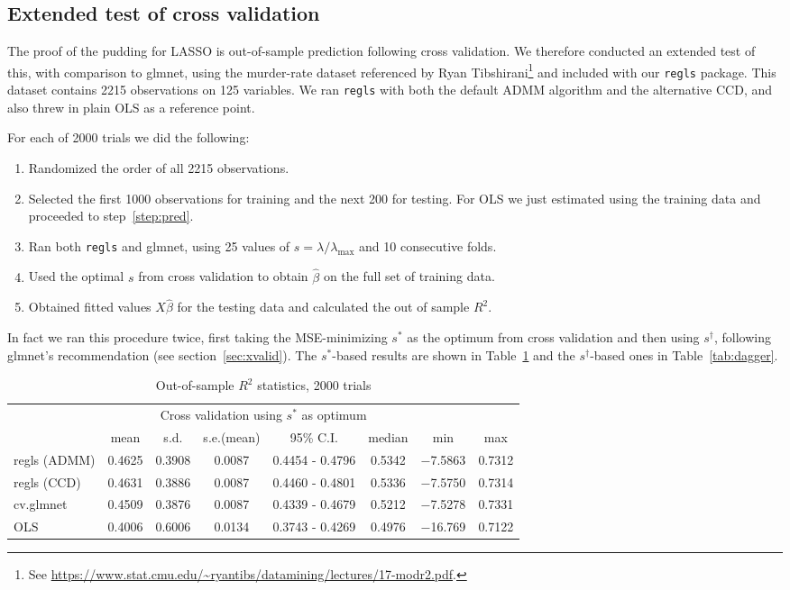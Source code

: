\documentclass{article}
\begin{document}
\subsection*{Extended test of cross validation}

The proof of the pudding for LASSO is out-of-sample prediction
following cross validation. We therefore conducted an extended test of
this, with comparison to \textsf{glmnet}, using the murder-rate
dataset referenced by Ryan Tibshirani\footnote{See
  \url{https://www.stat.cmu.edu/~ryantibs/datamining/lectures/17-modr2.pdf}.}
and included with our \texttt{regls} package. This dataset contains
2215 observations on 125 variables. We ran \texttt{regls} with both
the default ADMM algorithm and the alternative CCD, and also threw in
plain OLS as a reference point.

For each of 2000 trials we did the following:
\begin{enumerate}
\item Randomized the order of all 2215 observations.
\item Selected the first 1000 observations for training and the next
  200 for testing. For OLS we just estimated using the
  training data and proceeded to step~\ref{step:pred}.
\item Ran both \texttt{regls} and \textsf{glmnet}, using 25 values
  of $s = \lambda/\lambda_{\max}$ and 10 consecutive folds.
\item Used the optimal $s$ from cross validation to obtain
  $\hat{\beta}$ on the full set of training data.
\item Obtained fitted values $X\hat{\beta}$ for the testing data and
  calculated the out of sample $R^2$.
  \label{step:pred}
\end{enumerate}

In fact we ran this procedure twice, first taking the MSE-minimizing
$s^*$ as the optimum from cross validation and then using
$s^{\dagger}$, following \textsf{glmnet}'s recommendation (see
section~\ref{sec:xvalid}). The $s^*$-based results are shown in
Table~\ref{tab:star} and the $s^{\dagger}$-based ones in
Table~\ref{tab:dagger}.

\begin{table}[htbp]
  \centering
  \begin{tabular}{lccccccc}
    \multicolumn{8}{c}{Cross validation using $s^*$ as optimum} \\
 & mean & s.d. & s.e.(mean) & 95\% C.I. & median & min & max \\
\textsf{regls (ADMM)} & 0.4625 & 0.3908 & 0.0087 & 0.4454 - 0.4796 & 0.5342 & $-$7.5863 & 0.7312 \\
\textsf{regls (CCD)} & 0.4631 & 0.3886 & 0.0087 & 0.4460 - 0.4801 & 0.5336 & $-$7.5750 & 0.7314 \\
\textsf{cv.glmnet} & 0.4509 & 0.3876 & 0.0087 & 0.4339 - 0.4679 & 0.5212 & $-$7.5278 & 0.7331 \\[4pt]
\textsf{OLS}       & 0.4006 & 0.6006 & 0.0134 & 0.3743 - 0.4269 & 0.4976 & $-$16.769 & 0.7122
  \end{tabular}
  \caption{Out-of-sample $R^2$ statistics, 2000 trials}
  \label{tab:star}
\end{table}
\end{document}
